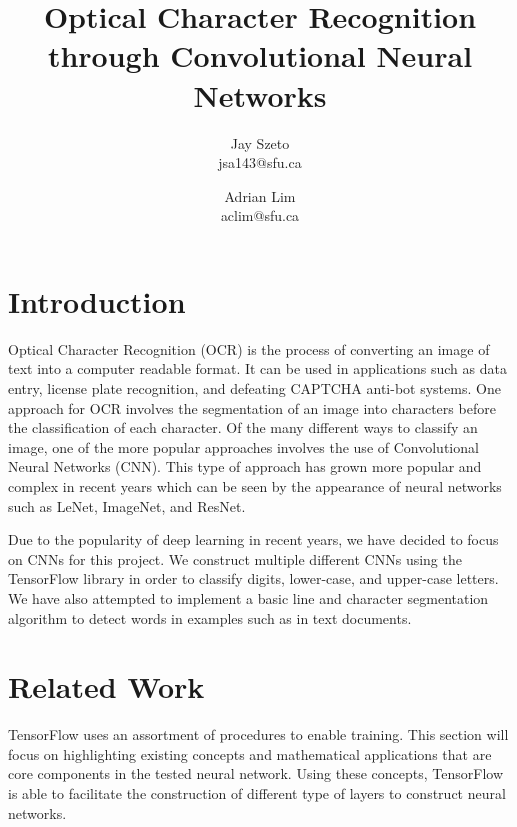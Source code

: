 \documentclass[11pt]{article}
\begin{document}
\title{\vspace{-2.5cm}Optical Character Recognition through Convolutional Neural Networks}
\author{Jay Szeto\\ jsa143@sfu.ca \and Adrian Lim\\ aclim@sfu.ca}
\maketitle

\hrulefill

\section{Introduction}
    Optical Character Recognition (OCR) is the process of converting an image of text into a computer readable format. \cite{ocr_wiki_2017} It can be used in applications such as data entry, license plate recognition, and defeating CAPTCHA anti-bot systems.\cite{ocr_wiki_2017} One approach for OCR involves the segmentation of an image into characters before the classification of each character. Of the many different ways to classify an image, one of the more popular approaches involves the use of Convolutional Neural Networks (CNN). \cite{lecun_bottou_bengio_haffner_1998} This type of approach has grown more popular and complex in recent years which can be seen by the appearance of neural networks such as LeNet, ImageNet, and ResNet. \cite{lecun_bottou_bengio_haffner_1998, image_net_2012, he2016deep}
    
    Due to the popularity of deep learning in recent years, we have decided to focus on CNNs for this project. We construct multiple different CNNs using the TensorFlow library in order to classify digits, lower-case, and upper-case letters.\cite{tensorflow15-whitepaper} We have also attempted to implement a basic line and character segmentation algorithm to detect words in examples such as in text documents.
    
\section{Related Work}
TensorFlow uses an assortment of procedures to enable training.\cite{tensorflow15-whitepaper} This section will focus on highlighting existing concepts and mathematical applications that are core components in the tested neural network. Using these concepts, TensorFlow is able to facilitate the construction of different type of layers to construct neural networks.~\cite{aGuideToLayers17}
\end{document}
